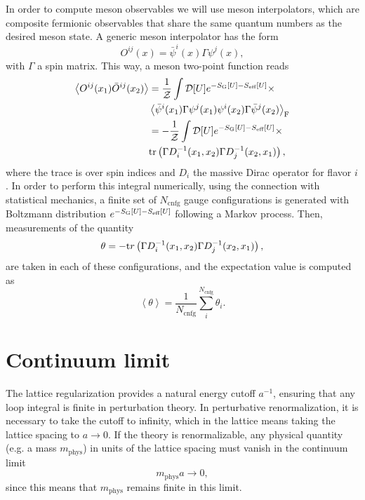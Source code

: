 In order to compute meson observables we will use meson interpolators, which are composite fermionic observables that share the same quantum numbers as the desired meson state. A generic meson interpolator has the form
\begin{equation}
O^{ij}(x)=\bar{\psi}^i(x)\Gamma\psi^j(x),
\end{equation}	
with $\Gamma$ a spin matrix. This way, a meson two-point function reads
\begin{align}
\label{ch_foundation:eq:path_int}
\left<O^{ij}(x_1)\bar{O}^{ij}(x_2)\right>&=\frac{1}{\mathcal{Z}}\int\mathcal{D}[U]e^{-S_{\textrm G}[U]-S_{\textrm{eff}}[U]}\times\\&\left<\bar{\psi}^i(x_1)\Gamma\psi^j(x_1)\psi^i(x_2)\Gamma\bar{\psi}^j(x_2)\right>_{\textrm F} \\
&=-\frac{1}{\mathcal{Z}}\int\mathcal{D}[U]e^{-S_{\textrm G}[U]-S_{\textrm{eff}}[U]}\times\\&{\textrm{tr}}\left(\Gamma D_i^{-1}(x_1,x_2)\Gamma D_j^{-1}(x_2,x_1)\right),
\end{align}
where the trace is over spin indices and $D_i$ the massive Dirac operator for flavor $i$. In order to perform this integral numerically, using the connection with statistical mechanics, a finite set of $N_{\textrm{cnfg}}$ gauge configurations is generated with Boltzmann distribution $e^{-S_{\textrm G}[U]-S_{\textrm{eff}}[U]}$ following a Markov process. Then, measurements of the quantity
\begin{equation}
\theta=-{\textrm tr}\left(\Gamma D_i^{-1}(x_1,x_2)\Gamma D_j^{-1}(x_2,x_1)\right),
\end{equation}
are taken in each of these configurations, and the expectation value is computed as
\begin{equation}
\left<\theta\right>=\frac{1}{N_{\textrm{cnfg}}}\sum_{i}^{N_{\textrm{cnfg}}}\theta_i.
\end{equation}



\section{Continuum limit}
\label{ch_foundation:sec:continuum-limit}

The lattice regularization provides a natural energy cutoff $a^{-1}$, ensuring that any loop integral is finite in perturbation theory. In perturbative renormalization, it is necessary to take the cutoff to infinity, which in the lattice means taking the lattice spacing to $a\rightarrow0$. If the theory is renormalizable, any physical quantity (e.g. a mass $m_{\textrm{phys}}$) in units of the lattice spacing must vanish in the continuum limit
\begin{equation}
\label{ch_foundation:eq:ma0}
m_{\textrm{phys}}a\rightarrow0,
\end{equation}
since this means that $m_{\textrm{phys}}$ remains finite in this limit. 


